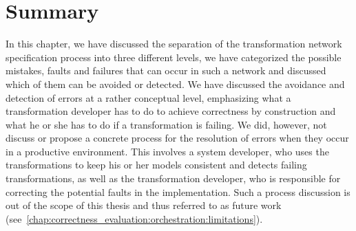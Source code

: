 \section{Summary}

In this chapter, we have discussed the separation of the transformation network specification process into three different levels, we have categorized the possible mistakes, faults and failures that can occur in such a network and discussed which of them can be avoided or detected.
We have discussed the avoidance and detection of errors at a rather conceptual level, emphasizing what a transformation developer has to do to achieve correctness by construction and what he or she has to do if a transformation is failing.
We did, however, not discuss or propose a concrete process for the resolution of errors when they occur in a productive environment.
This involves a system developer, who uses the transformations to keep his or her models consistent and detects failing transformations, as well as the transformation developer, who is responsible for correcting the potential faults in the implementation.
Such a process discussion is out of the scope of this thesis and thus referred to as future work (see~\autoref{chap:correctness_evaluation:orchestration:limitations}).



